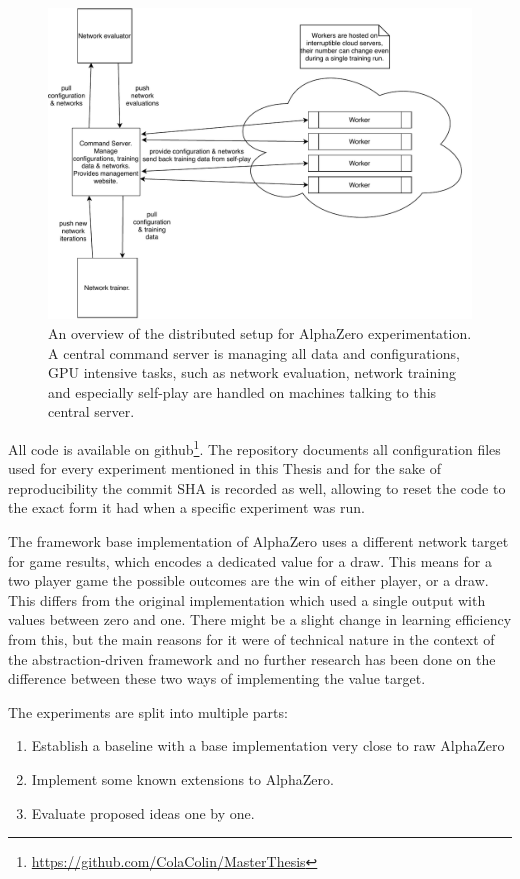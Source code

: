 \documentclass[12pt,onecolumn,oneside,titlepage]{article}
\begin{document}
\begin{figure}[H]
\centering
\includegraphics[clip,width=\columnwidth]{x0_framework_overview}
\caption{An overview of the distributed setup for AlphaZero experimentation. A central command server is managing all data and configurations, GPU intensive tasks, such as network evaluation, network training and especially self-play are handled on machines talking to this central server.}
\label{fig:x0_framework_overview}
\end{figure}

All code is available on github\footnote{\url{https://github.com/ColaColin/MasterThesis}}. The repository documents all configuration files used for every experiment mentioned in this Thesis and 
for the sake of reproducibility the commit SHA is recorded as well, allowing to reset the code to the exact form it had when a specific experiment was run.

The framework base implementation of AlphaZero uses a different network target for game results, which encodes a dedicated value for a draw. This means for a two player game the possible outcomes are the win of either player, or a draw.
This differs from the original implementation which used a single output with values between zero and one.
There might be a slight change in learning efficiency from this, but the main reasons for it were of technical nature in the context of the abstraction-driven framework and no further research has been done on the difference between these two ways of implementing the value target.

The experiments are split into multiple parts:
\begin{enumerate}
 \item Establish a baseline with a base implementation very close to raw AlphaZero
 \item Implement some known extensions to AlphaZero.
 \item Evaluate proposed ideas one by one.
\end{enumerate}
\end{document}

